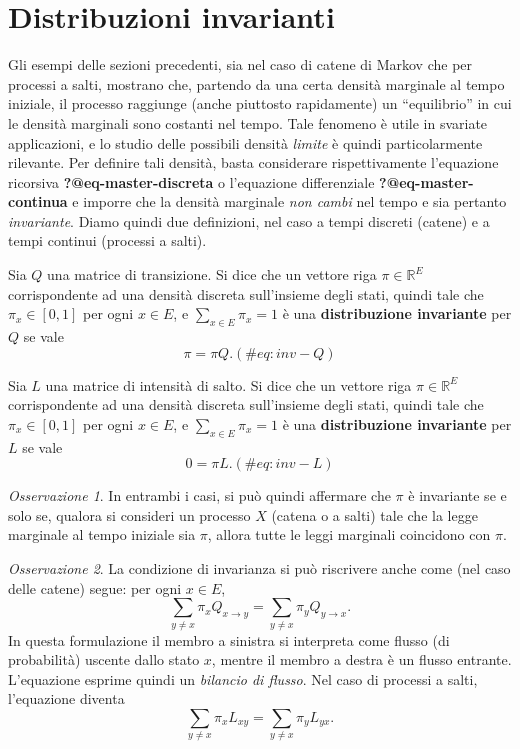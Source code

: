 \documentclass[
  italian,
  letterpaper,
]{book}
\newcommand{\R}{\mathbb{R}}
\theoremstyle{definition}
\theoremstyle{remark}
\newtheorem*{remark}{Osservazione}
\begin{document}
\section{Distribuzioni invarianti}\label{sec-invarianti}

Gli esempi delle sezioni precedenti, sia nel caso di catene di Markov
che per processi a salti, mostrano che, partendo da una certa densità
marginale al tempo iniziale, il processo raggiunge (anche piuttosto
rapidamente) un ``equilibrio'' in cui le densità marginali sono costanti
nel tempo. Tale fenomeno è utile in svariate applicazioni, e lo studio
delle possibili densità \emph{limite} è quindi particolarmente
rilevante. Per definire tali densità, basta considerare rispettivamente
l'equazione ricorsiva \textbf{?@eq-master-discreta} o l'equazione
differenziale \textbf{?@eq-master-continua} e imporre che la densità
marginale \emph{non cambi} nel tempo e sia pertanto \emph{invariante}.
Diamo quindi due definizioni, nel caso a tempi discreti (catene) e a
tempi continui (processi a salti).

Sia \(Q\) una matrice di transizione. Si dice che un vettore riga
\(\pi \in \R^E\) corrispondente ad una densità discreta sull'insieme
degli stati, quindi tale che \(\pi_x \in [0,1]\) per ogni \(x \in E\), e
\(\sum_{x \in E} \pi_x = 1\) è una \textbf{distribuzione invariante} per
\(Q\) se vale \[ \pi = \pi Q. (\#eq:inv-Q)\]

Sia \(L\) una matrice di intensità di salto. Si dice che un vettore riga
\(\pi \in \R^E\) corrispondente ad una densità discreta sull'insieme
degli stati, quindi tale che \(\pi_x \in [0,1]\) per ogni \(x \in E\), e
\(\sum_{x \in E} \pi_x = 1\) è una \textbf{distribuzione invariante} per
\(L\) se vale \[ 0 = \pi L. (\#eq:inv-L)\]

\begin{remark}
In entrambi i casi, si può quindi affermare che \(\pi\) è invariante se
e solo se, qualora si consideri un processo \(X\) (catena o a salti)
tale che la legge marginale al tempo iniziale sia \(\pi\), allora tutte
le leggi marginali coincidono con \(\pi\).
\end{remark}

\begin{remark}
La condizione di invarianza si può riscrivere anche come (nel caso delle
catene) segue: per ogni \(x \in E\),
\[ \sum_{y \neq x} \pi_x Q_{x \to y} = \sum_{y \neq x} \pi_y Q_{ y \to x}.\]
In questa formulazione il membro a sinistra si interpreta come flusso
(di probabilità) uscente dallo stato \(x\), mentre il membro a destra è
un flusso entrante. L'equazione esprime quindi un \emph{bilancio di
flusso}. Nel caso di processi a salti, l'equazione diventa
\[ \sum_{y \neq x} \pi_x L_{x  y} = \sum_{y \neq x} \pi_y L_{ yx}.\]
\end{remark}
\end{document}
